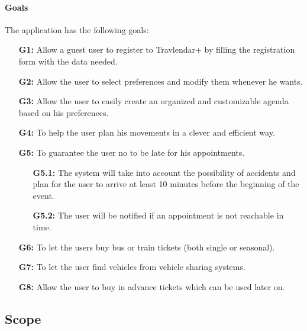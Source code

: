 \documentclass{article}
\begin{document}
\paragraph{Goals\\} The application has the following goals:
\begin{enumerate}
\item[\textbf{G1:}] Allow a guest user to register to Travlendar+ by filling the registration form with the data needed.
\item[\textbf{G2:}] Allow the user to select preferences and modify them whenever he wants.
\item[\textbf{G3:}] Allow the user to easily create an organized and customizable agenda based on his preferences.
\item[\textbf{G4:}] To help the user plan his movements in a clever and efficient way.
\item[\textbf{G5:}] To guarantee the user no to be late for his appointments.
\begin{enumerate}
\item[\textbf{G5.1:}] The system will take into account the possibility of accidents and plan for the user to arrive at least 10 minutes before the beginning of the event.
\item[\textbf{G5.2:}] The user will be notified if an appointment is not reachable in time.
\end{enumerate}
\item[\textbf{G6:}] To let the users buy bus or train tickets (both single or seasonal).
\item[\textbf{G7:}] To let the user find vehicles from vehicle sharing systems.
\item[\textbf{G8:}] Allow the user to buy in advance tickets which can be used later on.
\end{enumerate}
\newpage
\subsection{Scope}
\end{document}
